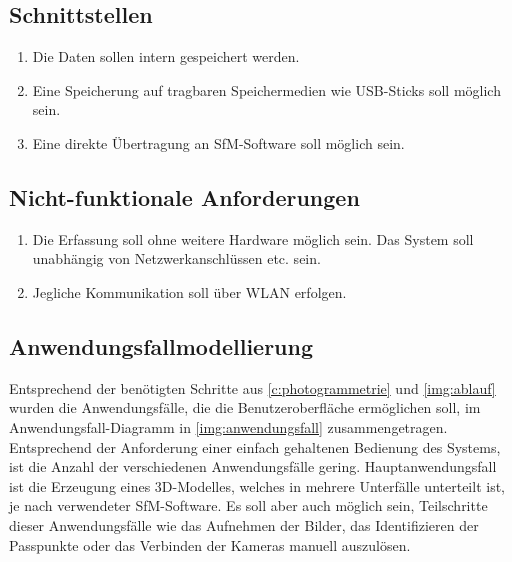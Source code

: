 \documentclass[./00PhotoBox.tex]{subfiles}
\begin{document}
\subsection{Schnittstellen}
\begin{enumerate}[label=S\arabic*]
  \item \label{e:intspeicher} Die Daten sollen intern gespeichert werden.
  \item \label{e:usbspeicher} Eine Speicherung auf tragbaren Speichermedien wie USB-Sticks soll möglich sein.
  \item \label{e:sfmsoftware} Eine direkte Übertragung an SfM-Software soll möglich sein.
\end{enumerate}

\subsection{Nicht-funktionale Anforderungen}
\begin{enumerate}[label=N\arabic*]
  \item \label{e:standalone} Die Erfassung soll ohne weitere Hardware möglich sein. Das System soll unabhängig von Netzwerkanschlüssen etc. sein.
  \item \label{e:wlan} Jegliche Kommunikation soll über WLAN erfolgen.
\end{enumerate}

\subsection{Anwendungsfallmodellierung}
\label{sec:Anwendungsfallmodellierung}

Entsprechend der benötigten Schritte aus \autoref{c:photogrammetrie} und \autoref{img:ablauf} wurden die Anwendungsfälle, die die Benutzeroberfläche ermöglichen soll, im Anwendungsfall-Dia\-gramm in \autoref{img:anwendungsfall} zusammengetragen. Entsprechend der Anforderung einer einfach gehaltenen Bedienung des Systems, ist die Anzahl der verschiedenen Anwendungsfälle gering. Hauptanwendungsfall ist die Erzeugung eines 3D-Modelles, welches in mehrere Unterfälle unterteilt ist, je nach verwendeter SfM-Software. Es soll aber auch möglich sein, Teilschritte dieser Anwendungsfälle wie das Aufnehmen der Bilder, das Identifizieren der Passpunkte oder das Verbinden der Kameras manuell auszulösen.
\end{document}
